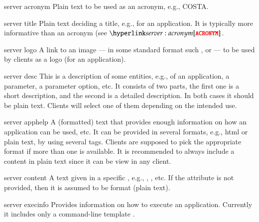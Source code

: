 \bigskip
\xmlstruct
{server}
{acronym}
{%
%
  Plain text to be used as an acronym, e.g., COSTA.
%
}



\bigskip
\xmlstruct
{server}
{title}
{%
%
  Plain text deciding a title, e.g., for an application. It is
  typically more informative than an acronym (see
  $\xmlstructref{server}{acronym}$.
%
}



\bigskip
\xmlstruct
{server}
{logo}
{%
%
  A link to an image --- in some standard format such
  ,  or 
  --- to be used by clients as a logo (for an application). 
%
}



\bigskip
\xmlstruct
{server}
{desc}
{%
%
  This is a description of some entities, e.g., of an application, a
  parameter, a parameter option, etc. It consists of two parts, the
  first one is a short description, and the second is a detailed
  description. In both cases it should be plain text. Clients will
  select one of them depending on the intended use.
%
}
{}%


\bigskip
\xmlstruct
{server}
{apphelp}
{%
%
  A (formatted) text that provides enough information on how an
  application can be used, etc. It can be provided in several formats,
  e.g., html or plain text, by using several 
  tags. Clients are supposed to pick the appropriate format if more
  than one is available. It is recommended to always include a content
  in plain text since it can be view in any client.
%
}



\bigskip
\xmlstruct
{server}
{content}
{%
%
  A text given in a specific , e.g.,
  , , etc. If the
  attribute  is not provided, then it is assumed
  to be  format (plain text).
%
}


\bigskip
\xmlstruct
{server}
{execinfo}
{%
%
  Provides information on how to execute an application. Currently it
  includes only a command-line template .
%
}


